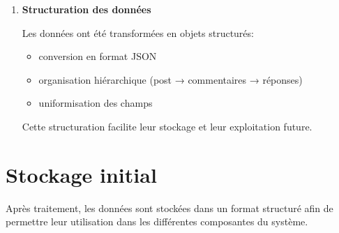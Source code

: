 \documentclass[12pt,a4paper,oneside]{report}
\begin{document}
\begin{enumerate}
    Cette étape est essentielle pour permettre l’analyse temporelle des réclamations.
    
        \item \textbf{Structuration des données}
    
    Les données ont été transformées en objets structurés:
    
    \begin{itemize}
        \item conversion en format JSON
        \item organisation hiérarchique (post → commentaires → réponses)
        \item uniformisation des champs
    \end{itemize}
    
    Cette structuration facilite leur stockage et leur exploitation future.
\end{enumerate}

\section{Stockage initial}
Après traitement, les données sont stockées dans un format structuré afin de permettre leur utilisation dans les différentes composantes du système.
\end{document}
